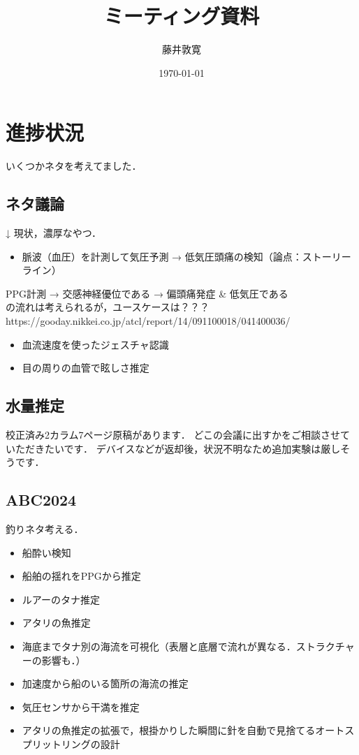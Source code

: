 \documentclass[a4j,10pt]{jarticle}
\title{ミーティング資料}
\author{藤井敦寛}
\date{\today}
\begin{document}
\maketitle

\section{進捗状況}
いくつかネタを考えてました．

\subsection{ネタ議論}
↓ 現状，濃厚なやつ．
\begin{itemize}
  \item 脈波（血圧）を計測して気圧予測 → 低気圧頭痛の検知（論点：ストーリーライン）
\end{itemize}
PPG計測 → 交感神経優位である → 偏頭痛発症 \& 低気圧である \\
の流れは考えられるが，ユースケースは？？？ \\
https://gooday.nikkei.co.jp/atcl/report/14/091100018/041400036/

\begin{itemize}
  \item 血流速度を使ったジェスチャ認識
  \item 目の周りの血管で眩しさ推定
\end{itemize}


\subsection{水量推定}
校正済み2カラム7ページ原稿があります．
どこの会議に出すかをご相談させていただきたいです．
デバイスなどが返却後，状況不明なため追加実験は厳しそうです．


\subsection{ABC2024}
釣りネタ考える．

\begin{itemize}
  \item 船酔い検知
  \item 船舶の揺れをPPGから推定
  \item ルアーのタナ推定
  \item アタリの魚推定
  \item 海底までタナ別の海流を可視化（表層と底層で流れが異なる．ストラクチャーの影響も．）
  \item 加速度から船のいる箇所の海流の推定
  \item 気圧センサから干満を推定
  \item アタリの魚推定の拡張で，根掛かりした瞬間に針を自動で見捨てるオートスプリットリングの設計
\end{itemize}
\end{document}
